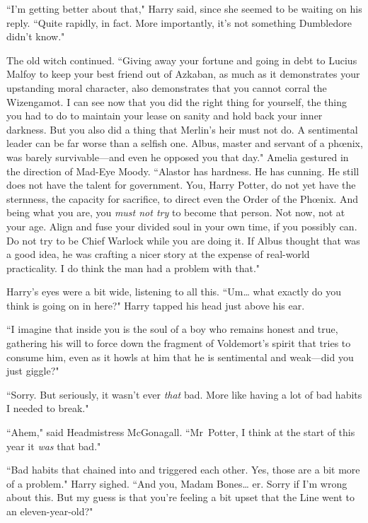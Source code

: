 ``I'm getting better about that," Harry said, since she seemed to be waiting on his reply. ``Quite rapidly, in fact. More importantly, it's not something Dumbledore didn't know."

The old witch continued. ``Giving away your fortune and going in debt to Lucius Malfoy to keep your best friend out of Azkaban, as much as it demonstrates your upstanding moral character, also demonstrates that you cannot corral the Wizengamot. I can see now that you did the right thing for yourself, the thing you had to do to maintain your lease on sanity and hold back your inner darkness. But you also did a thing that Merlin's heir must not do. A sentimental leader can be far worse than a selfish one. Albus, master and servant of a phœnix, was barely survivable—and even he opposed you that day." Amelia gestured in the direction of Mad-Eye Moody. ``Alastor has hardness. He has cunning. He still does not have the talent for government. You, Harry Potter, do not yet have the sternness, the capacity for sacrifice, to direct even the Order of the Phœnix. And being what you are, you \emph{must not try} to become that person. Not now, not at your age. Align and fuse your divided soul in your own time, if you possibly can. Do not try to be Chief Warlock while you are doing it. If Albus thought that was a good idea, he was crafting a nicer story at the expense of real-world practicality. I do think the man had a problem with that."

Harry's eyes were a bit wide, listening to all this. ``Um{\ldots} what exactly do you think is going on in here?" Harry tapped his head just above his ear.

``I imagine that inside you is the soul of a boy who remains honest and true, gathering his will to force down the fragment of Voldemort's spirit that tries to consume him, even as it howls at him that he is sentimental and weak—did you just giggle?"

``Sorry. But seriously, it wasn't ever \emph{that} bad. More like having a lot of bad habits I needed to break."

``Ahem," said Headmistress McGonagall. ``Mr~Potter, I think at the start of this year it \emph{was} that bad."

``Bad habits that chained into and triggered each other. Yes, those are a bit more of a problem." Harry sighed. ``And you, Madam Bones{\ldots} er. Sorry if I'm wrong about this. But my guess is that you're feeling a bit upset that the Line went to an eleven-year-old?"

